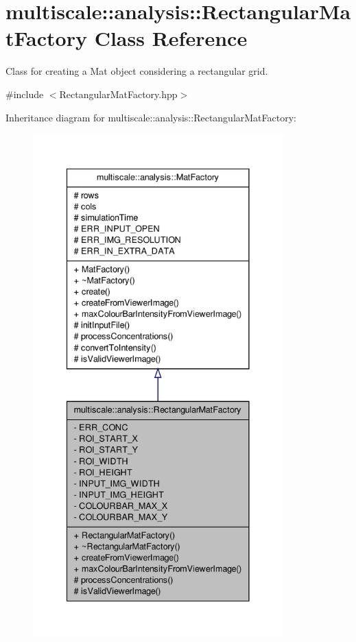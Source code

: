 \hypertarget{classmultiscale_1_1analysis_1_1RectangularMatFactory}{\section{multiscale\-:\-:analysis\-:\-:\-Rectangular\-Mat\-Factory \-Class \-Reference}
\label{classmultiscale_1_1analysis_1_1RectangularMatFactory}
}


\-Class for creating a \-Mat object considering a rectangular grid.  




{\ttfamily \#include $<$\-Rectangular\-Mat\-Factory.\-hpp$>$}



\-Inheritance diagram for multiscale\-:\-:analysis\-:\-:\-Rectangular\-Mat\-Factory\-:
\nopagebreak
\begin{figure}[H]
\begin{center}
\leavevmode
\includegraphics[height=550pt]{classmultiscale_1_1analysis_1_1RectangularMatFactory__inherit__graph}
\end{center}
\end{figure}



